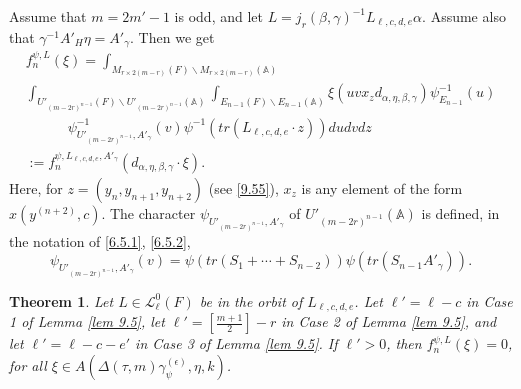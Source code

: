 \documentclass[12pts]{amsart}
\newcommand{\BA}{{\mathbb {A}}}
\newtheorem{thm}{Theorem}[section]
\begin{document}
Assume that $m=2m'-1$ is odd, and let $L=j_r(\beta,\gamma)^{-1}L_{\ell,c,d,e}\alpha$. Assume also that $\gamma^{-1}A'_H\eta=A'_\gamma$. Then we get
\begin{multline}\label{9.67}
f_n^{\psi,L}(\xi)=\int_{M_{r\times 2(m-r)}(F)\backslash M_{r\times 2(m-r)}(\BA)}\\
\int_{U'_{{(m-2r)}^{n-1}}(F)\backslash
	U'_{{(m-2r)}^{n-1}}(\BA)}\int_{E_{n-1}(F)\backslash E_{n-1}(\BA)}\xi(uvx_zd_{\alpha,\eta,\beta,\gamma})\psi^{-1}_{E_{n-1}}(u)\\
\quad\quad\quad\psi^{-1}_{U'_{(m-2r)^{n-1}},A'_\gamma}(v)\psi^{-1}(tr(L_{\ell,c,d,e}\cdot z))dudv dz\\
:=f_n^{\psi,L_{\ell,c,d,e},A'_\gamma}(d_{\alpha,\eta,\beta,\gamma}\cdot\xi).
\end{multline}
Here, for $z=(y_n,y_{n+1},y_{n+2})$ (see \eqref{9.55}), $x_z$ is any element of the form $x(y^{(n+2)},c)$. The character $\psi_{{U'_{{(m-2r)}^{n-1}},A'_\gamma}}$ of $U'_{(m-2r)^{n-1}}(\BA)$ is defined, in the notation of \eqref{6.5.1}, \eqref{6.5.2},
\begin{equation}\label{9.68}
\psi_{U'_{(m-2r)^{n-1}},A'_\gamma}(v)=\psi(tr(S_1+\cdots+S_{n-2}))\psi(tr(S_{n-1}A'_\gamma)).
\end{equation}
\begin{thm}\label{thm 9.7}
Let $L\in \mathcal{L}_\ell^0(F)$ be in the orbit of $L_{\ell,c,d,e}$. Let $\ell'=\ell-c$ in Case 1 of Lemma \ref{lem 9.5}, let $\ell'=[\frac{m+1}{2}]-r$ in Case 2 of Lemma \ref{lem 9.5}, and let $\ell'=\ell-c-e'$ in Case 3 of Lemma \ref{lem 9.5}. If $\ell'>0$, then $f_n^{\psi,L}(\xi)=0$, for all $\xi\in A(\Delta(\tau,m)\gamma_\psi^{(\epsilon)},\eta,k)$. 
\end{thm}
\end{document}
